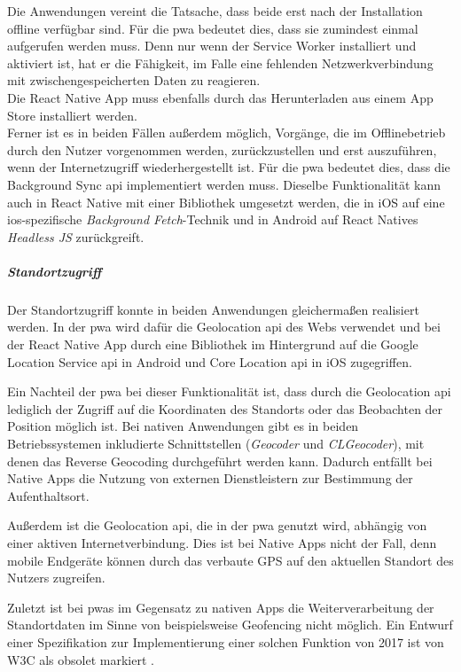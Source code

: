 Die Anwendungen vereint die Tatsache, dass beide erst nach der Installation offline verfügbar sind.
Für die \ac{pwa} bedeutet dies, dass sie zumindest einmal aufgerufen werden muss.
Denn nur wenn der Service Worker installiert und aktiviert ist, hat er die Fähigkeit, im Falle eine fehlenden Netzwerkverbindung mit zwischengespeicherten Daten zu reagieren.\\
Die React Native App muss ebenfalls durch das Herunterladen aus einem App Store installiert werden.\\
Ferner ist es in beiden Fällen außerdem möglich, Vorgänge, die im Offlinebetrieb durch den Nutzer vorgenommen werden, zurückzustellen und erst auszuführen, wenn der Internetzugriff wiederhergestellt ist.
Für die \ac{pwa} bedeutet dies, dass die Background Sync \ac{api} implementiert werden muss.
Dieselbe Funktionalität kann auch in React Native mit einer Bibliothek umgesetzt werden, die in iOS auf eine ios-spezifische \textit{Background Fetch}-Technik und in Android auf React Natives \textit{Headless JS} zurückgreift.

\subparagraph{Standortzugriff\\}
Der Standortzugriff konnte in beiden Anwendungen gleichermaßen realisiert werden.
In der \ac{pwa} wird dafür die Geolocation \ac{api} des Webs verwendet und bei der React Native App durch eine Bibliothek im Hintergrund auf die Google Location Service \ac{api} in Android und Core Location \ac{api} in iOS zugegriffen.

Ein Nachteil der \ac{pwa} bei dieser Funktionalität ist, dass durch die Geolocation \ac{api} lediglich der Zugriff auf die Koordinaten des Standorts oder das Beobachten der Position möglich ist.
Bei nativen Anwendungen gibt es in beiden Betriebssystemen inkludierte Schnittstellen (\textit{Geocoder} und \textit{CLGeocoder}), mit denen das Reverse Geocoding durchgeführt werden kann.
Dadurch entfällt bei Native Apps die Nutzung von externen Dienstleistern zur Bestimmung der Aufenthaltsort.

Außerdem ist die Geolocation \ac{api}, die in der \ac{pwa} genutzt wird, abhängig von einer aktiven Internetverbindung.
Dies ist bei Native Apps nicht der Fall, denn mobile Endgeräte können durch das verbaute GPS auf den aktuellen Standort des Nutzers zugreifen.

Zuletzt ist bei \acp{pwa} im Gegensatz zu nativen Apps die Weiterverarbeitung der Standortdaten im Sinne von beispielsweise Geofencing nicht möglich.
Ein Entwurf einer Spezifikation zur Implementierung einer solchen Funktion von 2017 ist von W3C als obsolet markiert \cite{GeofencingAPI.2017}.

